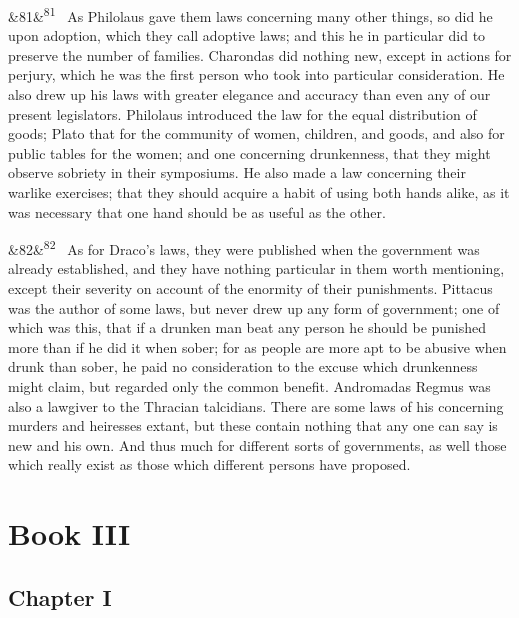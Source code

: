 \documentclass[12pt]{article}
\newcommand{\para}[1][]{\par\noindent\ifx&#1&\else\textsuperscript{\footnotesize #1}~\fi}
\begin{document}
\para[81] As Philolaus gave them laws concerning many other things, so did he upon adoption, which they call adoptive laws; and this he in particular did to preserve the number of families. Charondas did nothing new, except in actions for perjury, which he was the first person who took into particular consideration. He also drew up his laws with greater elegance and accuracy than even any of our present legislators. Philolaus introduced the law for the equal distribution of goods; Plato that for the community of women, children, and goods, and also for public tables for the women; and one concerning drunkenness, that they might observe sobriety in their symposiums. He also made a law concerning their warlike exercises; that they should acquire a habit of using both hands alike, as it was necessary that one hand should be as useful as the other.

\para[82] As for Draco's laws, they were published when the government was already established, and they have nothing particular in them worth mentioning, except their severity on account of the enormity of their punishments. Pittacus was the author of some laws, but never drew up any form of government; one of which was this, that if a drunken man beat any person he should be punished more than if he did it when sober; for as people are more apt to be abusive when drunk than sober, he paid no consideration to the excuse which drunkenness might claim, but regarded only the common benefit. Andromadas Regmus was also a lawgiver to the Thracian talcidians. There are some laws of his concerning murders and heiresses extant, but these contain nothing that any one can say is new and his own. And thus much for different sorts of governments, as well those which really exist as those which different persons have proposed.

\section*{Book III}

\subsection*{Chapter I}
\end{document}
